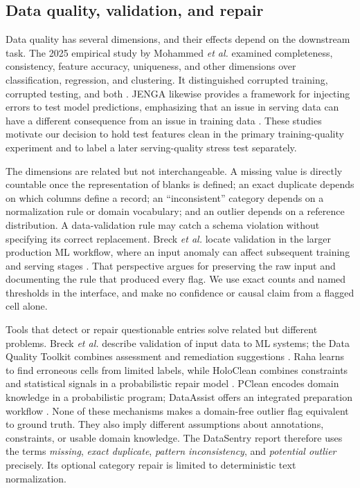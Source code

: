 \documentclass[conference]{IEEEtran}
\begin{document}
\subsection{Data quality, validation, and repair}
Data quality has several dimensions, and their effects depend on the downstream task. The 2025 empirical study by Mohammed \emph{et al.} examined completeness, consistency, feature accuracy, uniqueness, and other dimensions over classification, regression, and clustering. It distinguished corrupted training, corrupted testing, and both \cite{Mohammed2025}. JENGA likewise provides a framework for injecting errors to test model predictions, emphasizing that an issue in serving data can have a different consequence from an issue in training data \cite{Schelter2021}. These studies motivate our decision to hold test features clean in the primary training-quality experiment and to label a later serving-quality stress test separately.

The dimensions are related but not interchangeable. A missing value is directly countable once the representation of blanks is defined; an exact duplicate depends on which columns define a record; an ``inconsistent'' category depends on a normalization rule or domain vocabulary; and an outlier depends on a reference distribution. A data-validation rule may catch a schema violation without specifying its correct replacement. Breck \emph{et al.} locate validation in the larger production ML workflow, where an input anomaly can affect subsequent training and serving stages \cite{Breck2019}. That perspective argues for preserving the raw input and documenting the rule that produced every flag. We use exact counts and named thresholds in the interface, and make no confidence or causal claim from a flagged cell alone.

Tools that detect or repair questionable entries solve related but different problems. Breck \emph{et al.} describe validation of input data to ML systems; the Data Quality Toolkit combines assessment and remediation suggestions \cite{Breck2019,Gupta2021}. Raha learns to find erroneous cells from limited labels, while HoloClean combines constraints and statistical signals in a probabilistic repair model \cite{Mahdavi2019,Rekatsinas2017}. PClean encodes domain knowledge in a probabilistic program; DataAssist offers an integrated preparation workflow \cite{Lew2021,Goyle2024}. None of these mechanisms makes a domain-free outlier flag equivalent to ground truth. They also imply different assumptions about annotations, constraints, or usable domain knowledge. The DataSentry report therefore uses the terms \emph{missing}, \emph{exact duplicate}, \emph{pattern inconsistency}, and \emph{potential outlier} precisely. Its optional category repair is limited to deterministic text normalization.
\end{document}

